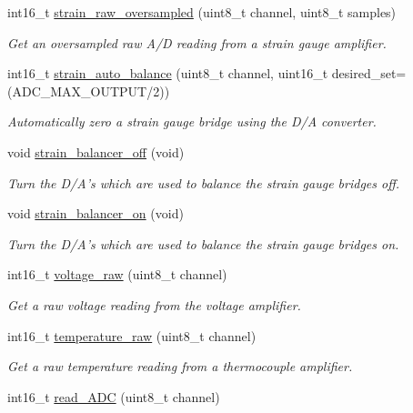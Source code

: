 \begin{DoxyCompactItemize}
int16\-\_\-t \hyperlink{classpolydaq2_ac35eb45623984ca51e96c805975824d0}{strain\-\_\-raw\-\_\-oversampled} (uint8\-\_\-t channel, uint8\-\_\-t samples)
\begin{DoxyCompactList}\small\item\em Get an oversampled raw A/\-D reading from a strain gauge amplifier. \end{DoxyCompactList}\item 
int16\-\_\-t \hyperlink{classpolydaq2_a22fa21af6fa0be4017619f645d8ca8db}{strain\-\_\-auto\-\_\-balance} (uint8\-\_\-t channel, uint16\-\_\-t desired\-\_\-set=(A\-D\-C\-\_\-\-M\-A\-X\-\_\-\-O\-U\-T\-P\-U\-T/2))
\begin{DoxyCompactList}\small\item\em Automatically zero a strain gauge bridge using the D/\-A converter. \end{DoxyCompactList}\item 
void \hyperlink{classpolydaq2_a745e78c13d4fa3d7e9a8b2c54a80c34b}{strain\-\_\-balancer\-\_\-off} (void)
\begin{DoxyCompactList}\small\item\em Turn the D/\-A's which are used to balance the strain gauge bridges off. \end{DoxyCompactList}\item 
void \hyperlink{classpolydaq2_afd57303eaefe880c0eeff769ab109f44}{strain\-\_\-balancer\-\_\-on} (void)
\begin{DoxyCompactList}\small\item\em Turn the D/\-A's which are used to balance the strain gauge bridges on. \end{DoxyCompactList}\item 
int16\-\_\-t \hyperlink{classpolydaq2_ace01e1bcf0895f63052c2914b3965c50}{voltage\-\_\-raw} (uint8\-\_\-t channel)
\begin{DoxyCompactList}\small\item\em Get a raw voltage reading from the voltage amplifier. \end{DoxyCompactList}\item 
int16\-\_\-t \hyperlink{classpolydaq2_a624826a08c0819b15e2c3f37a1864e53}{temperature\-\_\-raw} (uint8\-\_\-t channel)
\begin{DoxyCompactList}\small\item\em Get a raw temperature reading from a thermocouple amplifier. \end{DoxyCompactList}\item 
int16\-\_\-t \hyperlink{classpolydaq2_a087f1bcb158fa058560ff55d8defa039}{read\-\_\-\-A\-D\-C} (uint8\-\_\-t channel)

\end{DoxyCompactItemize}
